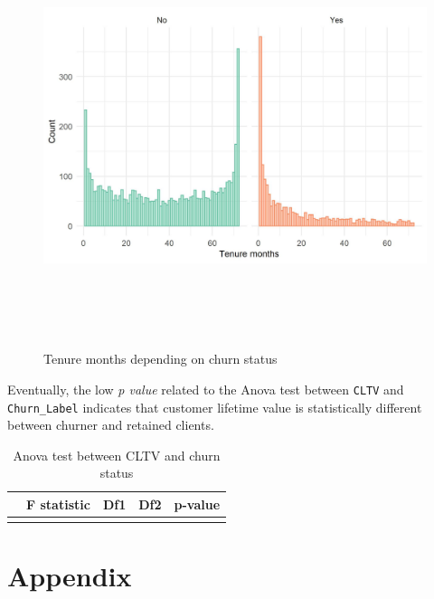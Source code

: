 \documentclass[
]{book}
\begin{document}
\begin{figure}

{\centering \includegraphics[width=500pt,height=350pt]{./imgs/duration_churn_plot} 

}

\caption{Tenure months depending on churn status}\label{fig:churndur}
\end{figure}

Eventually, the low \emph{p value} related to the Anova test between \texttt{CLTV} and \texttt{Churn\_Label} indicates that customer lifetime value is statistically different between churner and retained clients.

\begin{table}[H]

\caption{\label{tab:aovcltvchurn}Anova test between CLTV and churn status}
\centering
\begin{tabular}[t]{lrrrl}
\toprule
  & F statistic & Df1 & Df2 & p-value\\
\midrule
\cellcolor{gray!6}{Churn\_Label} & \cellcolor{gray!6}{117.57} & \cellcolor{gray!6}{1} & \cellcolor{gray!6}{7030} & \cellcolor{gray!6}{3.5e-27}\\
\bottomrule
\end{tabular}
\end{table}

\hypertarget{appendix}{%
\chapter*{Appendix}\label{appendix}}
\end{document}
